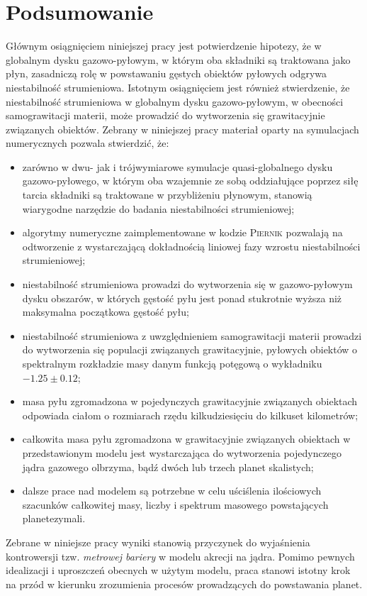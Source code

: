 
\chapter{Podsumowanie}

Głównym osiągnięciem niniejszej pracy jest potwierdzenie hipotezy, że w globalnym
dysku gazowo-pyłowym, w którym oba składniki są traktowana jako płyn, zasadniczą
rolę w
powstawaniu gęstych obiektów pyłowych odgrywa niestabilność strumieniowa. 
Istotnym osiągnięciem jest również stwierdzenie, że niestabilność
strumieniowa w globalnym dysku gazowo-pyłowym, w obecności samograwitacji
materii, może prowadzić do wytworzenia się grawitacyjnie związanych obiektów.
Zebrany w niniejszej pracy materiał oparty na symulacjach numerycznych
pozwala stwierdzić, że:

\begin{itemize}
   \item zarówno w dwu- jak i trójwymiarowe symulacje quasi-globalnego dysku
      gazowo-pyłowego, w którym oba wzajemnie ze sobą oddziałujące poprzez siłę
      tarcia składniki są traktowane w przybliżeniu płynowym, stanowią wiarygodne
      narzędzie do badania niestabilności strumieniowej;
   \item algorytmy numeryczne zaimplementowane w kodzie \textsc{Piernik}
      pozwalają na odtworzenie z wystarczającą dokładnością liniowej fazy
      wzrostu niestabilności strumieniowej;
   \item niestabilność strumieniowa prowadzi do wytworzenia się w gazowo-pyłowym
      dysku obszarów, w których gęstość pyłu jest ponad stukrotnie wyższa niż
      maksymalna początkowa gęstość pyłu;
   \item niestabilność strumieniowa z uwzględnieniem samograwitacji materii
      prowadzi do wytworzenia się populacji związanych grawitacyjnie, pyłowych
      obiektów o spektralnym rozkładzie masy danym funkcją potęgową o wykładniku
      $-1.25\pm0.12$;
   \item masa pyłu zgromadzona w pojedynczych grawitacyjnie związanych obiektach
      odpowiada ciałom o rozmiarach rzędu kilkudziesięciu do kilkuset
      kilometrów;
   \item całkowita masa pyłu zgromadzona w grawitacyjnie związanych obiektach w
      przedstawionym modelu 
      jest wystarczająca do wytworzenia pojedynczego jądra gazowego
      olbrzyma, bądź dwóch lub trzech planet skalistych;
   \item dalsze prace nad modelem są potrzebne w celu uściślenia ilościowych
      szacunków całkowitej masy, liczby i spektrum masowego powstających
      planetezymali.
\end{itemize}
Zebrane w niniejsze pracy wyniki stanowią przyczynek do wyjaśnienia
kontrowersji tzw. \emph{metrowej bariery} w modelu akrecji na
jądra. Pomimo pewnych idealizacji i uproszczeń obecnych w użytym modelu, praca
stanowi istotny krok na przód w kierunku zrozumienia procesów
prowadzących do powstawania planet.

